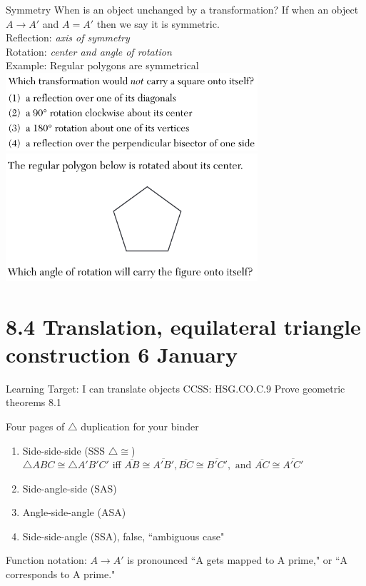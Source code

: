 \documentclass[onlytextwidth]{beamer}
\begin{document}
\begin{frame}{Symmetry}
  {When is an object unchanged by a transformation?}
  If when an object $A \rightarrow A'$ and $A = A'$ then we say it is symmetric. \\
  Reflection: \emph{axis of symmetry}\\
  Rotation: \emph{center and angle of rotation}\\[0.25cm]
  Example: Regular polygons are symmetrical\\[0.25cm]
  \pause \includegraphics[width=0.7\textwidth]{../graphics/symmetry-square_JA2018-15.png}\\
  \pause \includegraphics[width=0.7\textwidth]{../graphics/symmetry_JN2018-19.png}
\end{frame}





\section{8.4 Translation, equilateral triangle construction \hfill 6 January}
\begin{frame}{Learning Target: I can translate objects}
{CCSS: HSG.CO.C.9 Prove geometric theorems \hfill \alert{8.1}}
  \begin{block}{Four pages of $\triangle$ duplication for your binder}
    \begin{enumerate}
        \item Side-side-side (SSS $\triangle \cong$)\\
        $\triangle ABC \cong \triangle A'B'C'$ iff $\overline{AB} \cong \overline{A'B'}, \overline{BC} \cong \overline{B'C'}, \text{ and } \overline{AC} \cong \overline{A'C'}$
        \item Side-angle-side (SAS)
        \item Angle-side-angle (ASA)
        \item Side-side-angle (SSA), false, ``ambiguous case"
    \end{enumerate}
    \end{block}
    Function notation: $A \rightarrow A'$ is pronounced ``A gets mapped to A prime," or ``A corresponds to A prime."
  \end{frame}
\end{document}

